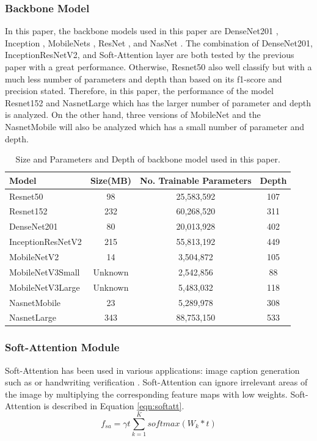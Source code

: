 \documentclass[sensors,article,submit,pdftex,moreauthors]{Definitions/mdpi}
\begin{document}
	\subsubsection{Backbone Model}
	In this paper, the backbone models used in this paper are DenseNet201 \cite{06993}, Inception \cite{00567}, MobileNets \cite{04861} \cite{04381} \cite{02244}, ResNet \cite{03385} \cite{05027}, and NasNet \cite{07012}. The combination of DenseNet201, InceptionResNetV2, and Soft-Attention layer are both tested by the previous paper \cite{03358} with a great performance. Otherwise, Resnet50 also well classify but with a much less number of parameters and depth than based on its f1-score and precision stated. Therefore, in this paper, the performance of the model Resnet152 and NasnetLarge which has the larger number of parameter and depth is analyzed. On the other hand, three versions of MobileNet and the NasnetMobile will also be analyzed which has a small number of parameter and depth. 
	
	\begin{table}[H]
		\centering
		\begin{tabular}{|l | c c c|} 
			\hline
			Model & Size(MB) & No. Trainable Parameters & Depth \\ 
			\hline
			Resnet50 & 98 & 25,583,592 & 107 \\ 
			\hline
			Resnet152 & 232 & 60,268,520 & 311 \\ 
			\hline
			DenseNet201 & 80 & 20,013,928 & 402 \\
			\hline
			InceptionResNetV2 & 215 & 55,813,192 & 449 \\
			\hline
			MobileNetV2 & 14 & 3,504,872 & 105 \\ 
			\hline
			MobileNetV3Small & Unknown & 2,542,856 & 88 \\ 
			\hline
			MobileNetV3Large & Unknown & 5,483,032 & 118 \\
			\hline
			NasnetMobile & 23 & 5,289,978 & 308 \\
			\hline
			NasnetLarge & 343 & 88,753,150 & 533 \\ 
			\hline
		\end{tabular}
		\caption{Size and Parameters and Depth of backbone model used in this paper.}
		\label{table:model-summary}
	\end{table}
	
	\subsubsection{Soft-Attention Module}
	Soft-Attention has been used in various applications: image caption generation such as \cite{03044} or handwriting verification \cite{202017}. Soft-Attention can ignore irrelevant areas of the image by multiplying the corresponding feature maps with low weights. Soft-Attention is described in Equation \ref{eqn:softatt}.
	\begin{equation}
		\label{eqn:softatt}
		f_{sa} = \gamma t\sum_{k=1}^{K}softmax(W_k * t)
	\end{equation}
	
\end{document}
